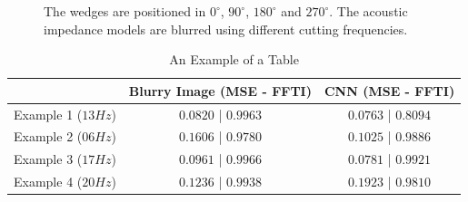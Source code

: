 \documentclass[conference]{IEEEtran}
\begin{document}
\begin{figure}[!t]
{\label{fig_scenario5_case_cnn}}
\caption{The wedges are positioned in $0^{\circ}$, $90^{\circ}$, $180^{\circ}$ and $270^{\circ}$. The acoustic impedance models are blurred using different cutting frequencies.}
\label{fig_scenario5}
\end{figure}

\begin{table}[!t]
\renewcommand{\arraystretch}{1.2}
\caption{An Example of a Table}
\label{table_caso_5}
\centering
\begin{tabular}{|c||c||c|}
\hline
  & Blurry Image (MSE - FFTI) & CNN (MSE - FFTI)\\
\hline
Example 1 ($13Hz$) & $0.0820$ | $0.9963$ & $0.0763$ | $0.8094$\\
\hline
Example 2 ($06Hz$)& $0.1606$ | $0.9780$ & $0.1025$ | $0.9886$\\
\hline
Example 3 ($17Hz$)& $0.0961$ | $0.9966$ & $0.0781$ | $0.9921$\\
\hline
Example 4 ($20Hz$)& $0.1236$ | $0.9938$ & $0.1923$ | $0.9810$\\
\hline
\end{tabular}
\end{table}
\end{document}
